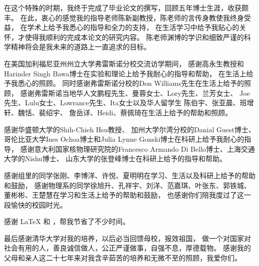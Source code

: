 
\begin{acknowledgements}

在这个特殊的时期，我终于完成了毕业论文的撰写，回顾五年博士生涯，收获颇丰。
在此，衷心的感觉我的指导老师陈新副教授，陈老师的言传身教使我终身受益，
在学术上给予我悉心的指导和全力的支持，
在生活学习中给予我贴心的关怀，才使得我顺利的完成本论文的研究内容。
陈老师渊博的学识和细致严谨的科学精神将会是我未来的道路上一直追求的目标。

在美国加利福尼亚州州立大学弗雷斯诺分校交流访学期间，
感谢高永生教授和Harinder Singh Bawa博士在实验和理论上给予我耐心的指导和帮助，
在生活上给予我悉心的照顾。
同时感谢弗雷斯诺分校的Don Williams先生在生活上给予的照顾，
感谢弗雷斯诺当地华人文鹏程先生、曼蓉女士、Lory先生、兰芳女士、
Joe先生、Lulu女士、Lowrance先生、Ita女士以及华人留学生
陈伯宇、张亚晨、班增轩、魏恬、裴绍宇、
詹岳详、Heidi、蔡佩琦在生活上给予的帮助和照顾。

感谢华盛顿大学的Shih-Chieh Hsu教授、
加州大学尔湾分校的Danial Guest博士、
哥伦比亚大学Ines Ochoa博士和Julia Lynne Gonski‎博士在科研上给予我耐心的指导，
感谢意大利国家核物理研究院的Francesco Armando Di Bello博士、上海交通大学的Nishu博士、
山东大学的张登峰博士在科研上给予的指导和帮助。

感谢组里的同学张刚、李博洋、许悦、夏明明在学习、生活以及科研上给予的帮助和鼓励，
感谢物理系的同学徐旭升、孔祥宇、刘洋、范嘉琪、叶张东、郭铁城、董彬彬、王楚慧在学习和生活上给予的帮助和鼓励，
也感谢你们陪我度过了这一段愉快的校园时光。

感谢 \LaTeX{} 和 \thuthesis\cite{thuthesis}，帮我节省了不少时间。

最后感谢清华大学对我的培养，以后必当回馈母校，报效祖国，
做一个对国家对社会有用的人，善良诚信做人，公正严谨做事，自强不息，厚德载物。
感谢我的父母和亲人这二十七年来对我含辛茹苦的培养和无微不至的照顾，我爱你们。

\end{acknowledgements}
